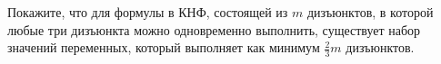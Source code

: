 Покажите, что для формулы в КНФ, состоящей из $m$ дизъюнктов, в которой любые три дизъюнкта можно
одновременно выполнить, существует набор значений переменных, который выполняет как минимум
$\frac{2}{3}m$ дизъюнктов.
